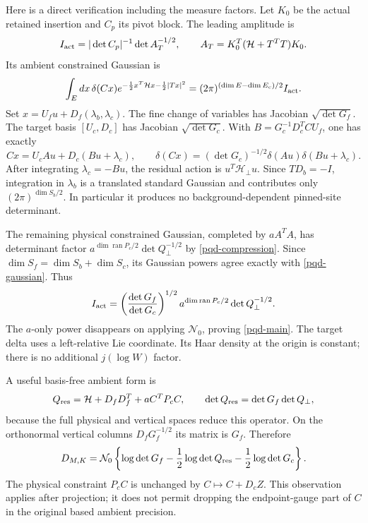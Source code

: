 Here is a direct verification including the measure factors. Let
$K_0$ be the actual retained insertion and $C_p$ its pivot block. The
leading amplitude is
\begin{equation}
 I_{\rm act}=|\det C_p|^{-1}\det A_T^{-1/2},\qquad
 A_T=K_0^T(\mathcal H+T^TT)K_0.\label{pqd-amplitude}
\end{equation}
Its ambient constrained Gaussian is
\begin{equation}
 \int_E dx\,\delta(Cx)
  e^{-\frac12x^T\mathcal H x-\frac12|Tx|^2}
 =(2\pi)^{(\dim E-\dim E_c)/2}I_{\rm act}.
 \label{pqd-gaussian}
\end{equation}
Set $x=U_fu+D_f(\lambda_b,\lambda_c)$. The fine change of variables
has Jacobian $\sqrt{\det G_f}$. The target basis $[U_c,D_c]$ has
Jacobian $\sqrt{\det G_c}$. With
$B=G_c^{-1}D_c^TCU_f$, one has exactly
\begin{equation}
 Cx=U_cAu+D_c(Bu+\lambda_c),\qquad
 \delta(Cx)=(\det G_c)^{-1/2}
                      \delta(Au)\delta(Bu+\lambda_c).
 \label{pqd-target-delta}
\end{equation}
After integrating $\lambda_c=-Bu$, the residual action is
$u^T\mathcal H_\perp u$. Since $TD_b=-I$, integration in
$\lambda_b$ is a translated standard Gaussian and contributes only
$(2\pi)^{\dim S_b/2}$. In particular it produces no background-dependent
pinned-site determinant.

The remaining physical constrained Gaussian, completed by $aA^TA$,
has determinant factor
$a^{\dim\operatorname{ran}P_c/2}\det Q_\perp^{-1/2}$ by
\eqref{pqd-compression}. Since
$\dim S_f=\dim S_b+\dim S_c$, its Gaussian powers agree exactly with
\eqref{pqd-gaussian}. Thus
\begin{equation}
 I_{\rm act}=
 \left(\frac{\det G_f}{\det G_c}\right)^{1/2}
 a^{\dim\operatorname{ran}P_c/2}\det Q_\perp^{-1/2}.
 \label{pqd-amplitude-result}
\end{equation}
The $a$-only power disappears on applying $\mathcal N_0$, proving
\eqref{pqd-main}. The target delta uses a left-relative Lie coordinate.
Its Haar density at the origin is constant; there is no additional
$j(\log W)$ factor.

A useful basis-free ambient form is
\begin{equation}
 Q_{\rm res}=\mathcal H+D_fD_f^T+aC^TP_cC,
 \qquad \det Q_{\rm res}=\det G_f\det Q_\perp,
 \label{pqd-ambient}
\end{equation}
because the full physical and vertical spaces reduce this operator.
On the orthonormal vertical columns $D_fG_f^{-1/2}$ its matrix is
$G_f$. Therefore
\begin{equation}
 D_{M,K}=\mathcal N_0\left\{
 \log\det G_f-\frac12\log\det Q_{\rm res}
                                      -\frac12\log\det G_c\right\}.
 \label{pqd-ambient-identity}
\end{equation}
The physical constraint $P_cC$ is unchanged by $C\mapsto C+D_cZ$.
This observation applies after projection; it does not permit dropping
the endpoint-gauge part of $C$ in the original based ambient precision.


